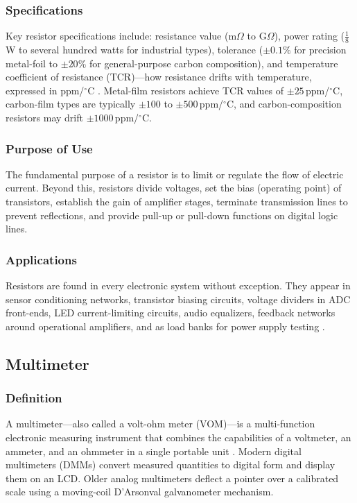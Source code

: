 \documentclass[12pt, a4paper, twoside]{report}
\begin{document}
\subsubsection*{Specifications}
Key resistor specifications include: resistance value (m$\Omega$ to G$\Omega$), power
rating ($\frac{1}{8}$\,W to several hundred watts for industrial types), tolerance
($\pm0.1\%$ for precision metal-foil to $\pm20\%$ for general-purpose carbon composition),
and temperature coefficient of resistance (TCR)---how resistance drifts with temperature,
expressed in ppm/$^\circ$C \cite{electronics_notes:resistor}. Metal-film resistors achieve
TCR values of $\pm25$\,ppm/$^\circ$C, carbon-film types are typically
$\pm100$ to $\pm500$\,ppm/$^\circ$C, and carbon-composition resistors may drift
$\pm1000$\,ppm/$^\circ$C.

\subsubsection*{Purpose of Use}
The fundamental purpose of a resistor is to limit or regulate the flow of electric
current. Beyond this, resistors divide voltages, set the bias (operating point) of
transistors, establish the gain of amplifier stages, terminate transmission lines to
prevent reflections, and provide pull-up or pull-down functions on digital logic lines.

\subsubsection*{Applications}
Resistors are found in every electronic system without exception. They appear in
sensor conditioning networks, transistor biasing circuits, voltage dividers in ADC
front-ends, LED current-limiting circuits, audio equalizers, feedback networks around
operational amplifiers, and as load banks for power supply testing \cite{boylestad2015}.

\subsection{Multimeter}

\subsubsection*{Definition}
A multimeter---also called a volt-ohm meter (VOM)---is a multi-function electronic
measuring instrument that combines the capabilities of a voltmeter, an ammeter, and an
ohmmeter in a single portable unit \cite{wiki:multimeter}. Modern digital multimeters
(DMMs) convert measured quantities to digital form and display them on an LCD. Older
analog multimeters deflect a pointer over a calibrated scale using a moving-coil
D'Arsonval galvanometer mechanism.
\end{document}
